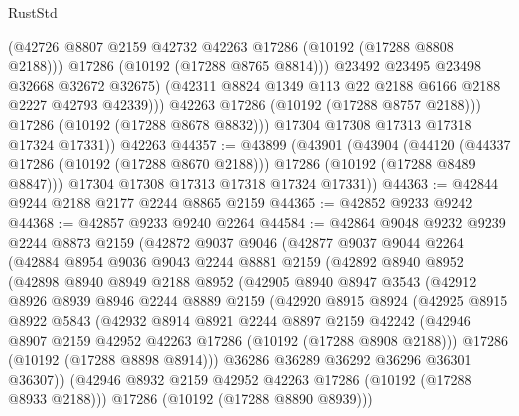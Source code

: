 \begin{lexlean}{RustStd}
\begin{coremodule}
                    (@42726 @8807 @2159 @42732 @42263 @17286 (@10192 (@17288 @8808 @2188)))
                    @17286
                    (@10192 (@17288 @8765 @8814)))
                  @23492
                  @23495
                  @23498
                  @32668
                  @32672
                  @32675)
                (@42311 @8824 @1349 @113 @22 @2188 @6166 @2188 @2227 @42793 @42339)))
            @42263
            @17286
            (@10192 (@17288 @8757 @2188)))
          @17286
          (@10192 (@17288 @8678 @8832)))
        @17304
        @17308
        @17313
        @17318
        @17324
        @17331))
    @42263
@44357 := @43899
    (@43901
      (@43904
        (@44120 (@44337 @17286 (@10192 (@17288 @8670 @2188))) @17286 (@10192 (@17288 @8489 @8847)))
        @17304
        @17308
        @17313
        @17318
        @17324
        @17331))
@44363 := @42844 @9244 @2188 @2177 @2244 @8865 @2159
@44365 := @42852 @9233 @9242
@44368 := @42857 @9233 @9240 @2264
@44584 := @42864
    @9048
    @9232
    @9239
    @2244
    @8873
    @2159
    (@42872
      @9037
      @9046
      (@42877
        @9037
        @9044
        @2264
        (@42884
          @8954
          @9036
          @9043
          @2244
          @8881
          @2159
          (@42892
            @8940
            @8952
            (@42898
              @8940
              @8949
              @2188
              @8952
              (@42905
                @8940
                @8947
                @3543
                (@42912
                  @8926
                  @8939
                  @8946
                  @2244
                  @8889
                  @2159
                  (@42920
                    @8915
                    @8924
                    (@42925
                      @8915
                      @8922
                      @5843
                      (@42932
                        @8914
                        @8921
                        @2244
                        @8897
                        @2159
                        @42242
                        (@42946 @8907 @2159 @42952 @42263 @17286 (@10192 (@17288 @8908 @2188)))
                        @17286
                        (@10192 (@17288 @8898 @8914)))
                      @36286
                      @36289
                      @36292
                      @36296
                      @36301
                      @36307))
                  (@42946 @8932 @2159 @42952 @42263 @17286 (@10192 (@17288 @8933 @2188)))
                  @17286
                  (@10192 (@17288 @8890 @8939)))

\end{coremodule}
\end{lexlean}
